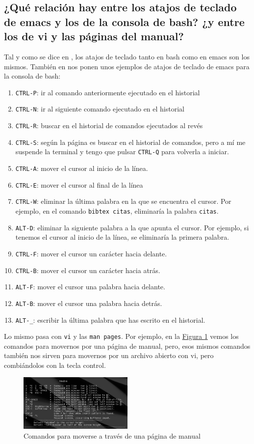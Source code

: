 \documentclass[10pt,a4paper,spanish]{article}
\numberwithin{equation}{section} %
\numberwithin{figure}{section} %
\numberwithin{table}{section} %
\begin{document}
\subsection{¿Qué relación hay entre los atajos de teclado de emacs y los de la consola de bash? ¿y entre los de vi y las páginas del manual?}
Tal y como se dice en \cite{keysemacs}, los atajos de teclado tanto en bash como en emacs son los mismos. También en \cite{keysemacs} nos ponen unos ejemplos de atajos de teclado de emacs para la consola de bash:
\begin{enumerate}[$\heartsuit$]
    \item \texttt{CTRL-P}: ir al comando anteriormente ejecutado en el historial
    \item \texttt{CTRL-N}: ir al siguiente comando ejecutado en el historial
    \item \texttt{CTRL-R}: buscar en el historial de comandos ejecutados al revés
    \item \texttt{CTRL-S}: según la página es buscar en el historial de comandos, pero a mí me suspende la terminal y tengo que pulsar \texttt{CTRL-Q} para volverla a iniciar.
    \item \texttt{CTRL-A}: mover el cursor al inicio de la línea.
    \item \texttt{CTRL-E}: mover el cursor al final de la línea
    \item \texttt{CTRL-W}: eliminar la última palabra en la que se encuentra el cursor. Por ejemplo, en el comando \texttt{bibtex citas}, eliminaría la palabra \texttt{citas}.
    \item \texttt{ALT-D}: eliminar la siguiente palabra a la que apunta el cursor. Por ejemplo, si tenemos el cursor al inicio de la línea, se eliminaría la primera palabra.
    \item \texttt{CTRL-F}: mover el cursor un carácter hacia delante.
    \item \texttt{CTRL-B}: mover el cursor un carácter hacia atrás.
    \item \texttt{ALT-F}: mover el cursor una palabra hacia delante.
    \item \texttt{ALT-B}: mover el cursor una palabra hacia detrás.
    \item \texttt{ALT-\_}: escribir la última palabra que has escrito en el historial.
\end{enumerate}

Lo mismo pasa con \texttt{vi} y las \texttt{man pages}. Por ejemplo, en la \hyperref[man]{Figura \ref*{man}} vemos los comandos para movernos por una página de manual, pero, esos mismos comandos también nos sirven para movernos por un archivo abierto con vi, pero combiándolos con la tecla control.

\begin{figure}[!h]
\centering
\includegraphics[width=0.5\textwidth]{20}
\caption{Comandos para moverse a través de una página de manual}
\label{man}
\end{figure}

\end{document}
